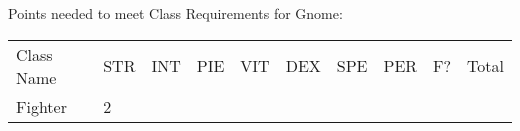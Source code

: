 \documentclass[12pt]{article}
\begin{document}
Points needed to meet Class Requirements for Gnome:

\begin{longtable}[]{@{}llllllllll@{}}
\toprule
\begin{minipage}[t]{0.13\columnwidth}\raggedright\strut
Class Name
\strut\end{minipage} &
\begin{minipage}[t]{0.06\columnwidth}\raggedright\strut
STR
\strut\end{minipage} &
\begin{minipage}[t]{0.06\columnwidth}\raggedright\strut
INT
\strut\end{minipage} &
\begin{minipage}[t]{0.06\columnwidth}\raggedright\strut
PIE
\strut\end{minipage} &
\begin{minipage}[t]{0.06\columnwidth}\raggedright\strut
VIT
\strut\end{minipage} &
\begin{minipage}[t]{0.06\columnwidth}\raggedright\strut
DEX
\strut\end{minipage} &
\begin{minipage}[t]{0.06\columnwidth}\raggedright\strut
SPE
\strut\end{minipage} &
\begin{minipage}[t]{0.06\columnwidth}\raggedright\strut
PER
\strut\end{minipage} &
\begin{minipage}[t]{0.07\columnwidth}\raggedright\strut
F?
\strut\end{minipage} &
\begin{minipage}[t]{0.08\columnwidth}\raggedright\strut
Total
\strut\end{minipage}\tabularnewline
\begin{minipage}[t]{0.13\columnwidth}\raggedright\strut
Fighter
\strut\end{minipage} &
\begin{minipage}[t]{0.06\columnwidth}\raggedright\strut
2
\strut\end{minipage} &
\begin{minipage}[t]{0.06\columnwidth}\raggedright\strut
\strut\end{minipage} &
\begin{minipage}[t]{0.06\columnwidth}\raggedright\strut
\strut\end{minipage} &
\begin{minipage}[t]{0.06\columnwidth}\raggedright\strut
\strut\end{minipage} &

\end{longtable}
\end{document}
